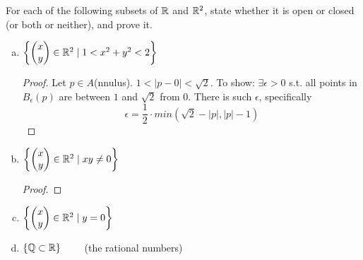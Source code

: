 For each of the following subsets of $\mathbb{R}$ and $\mathbb{R}^2$, state whether it is open or closed (or both or neither), and prove it.
\begin{enumerate}[a.]
	\item $\left\{ \begin{pmatrix} x \\ y \end{pmatrix} \in \mathbb{R}^2 \mid 1 < x^2+y^2 < 2 \right\}$ \\
	\begin{proof}
		Let $p\in A$(nnulus). $1 < |p-0| < \sqrt{2}$. To show: $\exists \epsilon > 0$ s.t. all points in $B_\epsilon (p)$ are between $1$ and $\sqrt{2}$ from 0. There is such $\epsilon$, specifically
		\[\epsilon = \frac{1}{2}\cdot min(\sqrt{2}-\left|p\right|, \left|p\right| - 1)\]
	\end{proof}
	\item $\left\{ \begin{pmatrix} x \\ y \end{pmatrix} \in \mathbb{R}^2 \mid xy\neq 0 \right\}$ \\
	\begin{proof}

	\end{proof}
	\item $\left\{ \begin{pmatrix} x \\ y \end{pmatrix} \in \mathbb{R}^2 \mid y=0 \right\}$
	\item $\left\{ \mathbb{Q} \subset \mathbb{R} \right\}\qquad$ (the rational numbers)
\end{enumerate}
